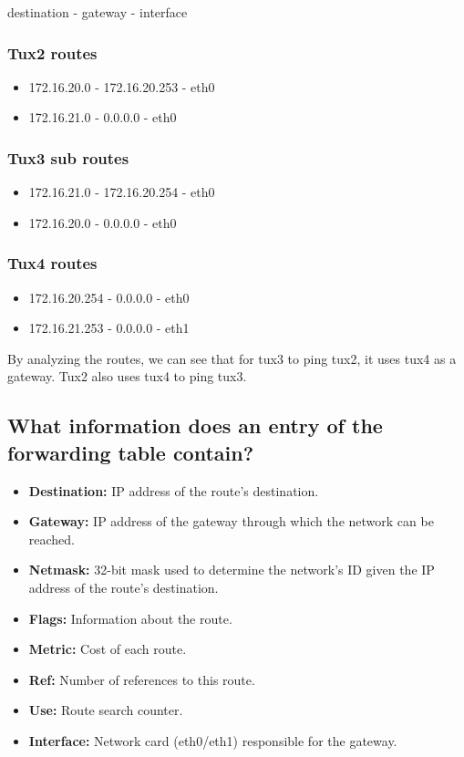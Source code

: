 \documentclass[11pt]{report}
\begin{document}
destination - gateway - interface

\subsubsection{Tux2 routes}

\begin{itemize}
    \item 172.16.20.0 - 172.16.20.253 - eth0
    \item 172.16.21.0 - 0.0.0.0 - eth0
\end{itemize}

\subsubsection{Tux3 sub routes}

\begin{itemize}
    \item 172.16.21.0 - 172.16.20.254 - eth0
    \item 172.16.20.0 - 0.0.0.0 - eth0
\end{itemize}

\subsubsection{Tux4 routes}

\begin{itemize}
    \item 172.16.20.254 - 0.0.0.0 - eth0
    \item 172.16.21.253 - 0.0.0.0 - eth1
\end{itemize}

By analyzing the routes, we can see that for tux3 to ping tux2, it uses tux4 as a gateway. Tux2 also uses tux4 to ping tux3.    

\subsection{What information does an entry of the forwarding table contain?}

\begin{itemize}
    \item \textbf{Destination:} IP address of the route's destination.
    \item \textbf{Gateway:} IP address of the gateway through which the network can be reached.
    \item \textbf{Netmask:} 32-bit mask used to determine the network's ID given the IP address of the route's destination.
    \item \textbf{Flags:} Information about the route.
    \item \textbf{Metric:} Cost of each route.
    \item \textbf{Ref:} Number of references to this route.
    \item \textbf{Use: } Route search counter.
    \item \textbf{Interface: } Network card (eth0/eth1) responsible for the gateway.
\end{itemize}
\end{document}
